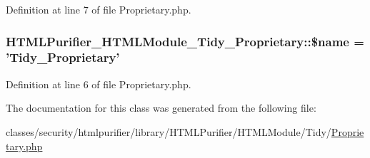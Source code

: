 Definition at line 7 of file Proprietary.\+php.

\hypertarget{classHTMLPurifier__HTMLModule__Tidy__Proprietary_afc1b22277b5705ae192b8a6ddfd0a070}{
\subsubsection[{\$name}]{\setlength{\rightskip}{0pt plus 5cm}H\+T\+M\+L\+Purifier\+\_\+\+H\+T\+M\+L\+Module\+\_\+\+Tidy\+\_\+\+Proprietary\+::\$name = 'Tidy\+\_\+\+Proprietary'}}\label{classHTMLPurifier__HTMLModule__Tidy__Proprietary_afc1b22277b5705ae192b8a6ddfd0a070}


Definition at line 6 of file Proprietary.\+php.



The documentation for this class was generated from the following file\+:\begin{DoxyCompactItemize}
\item 
classes/security/htmlpurifier/library/\+H\+T\+M\+L\+Purifier/\+H\+T\+M\+L\+Module/\+Tidy/\hyperlink{Tidy_2Proprietary_8php}{Proprietary.\+php}\end{DoxyCompactItemize}
